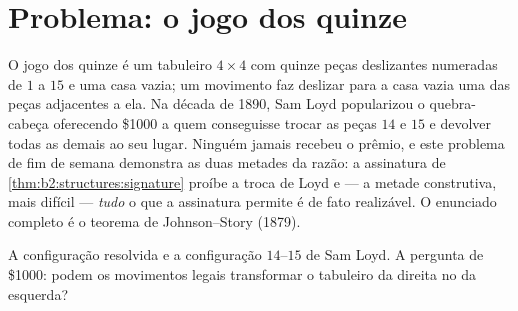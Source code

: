 \section{Problema: o jogo dos quinze}

O jogo dos quinze é um tabuleiro $4 \times 4$ com quinze peças
deslizantes numeradas de $1$ a $15$ e uma casa vazia; um movimento faz
deslizar para a casa vazia uma das peças adjacentes a ela. Na década de
1890, Sam Loyd popularizou o quebra-cabeça oferecendo \$1000 a quem
conseguisse trocar as peças $14$ e $15$ e devolver todas as demais ao seu
lugar. Ninguém jamais recebeu o prêmio, e este problema de fim de semana
demonstra as duas metades da razão: a assinatura de
\cref{thm:b2:structures:signature} proíbe a troca de Loyd e
--- a metade construtiva, mais difícil --- \emph{tudo} o que a
assinatura permite é de fato realizável. O enunciado completo é o
teorema de Johnson--Story (1879).

\begin{omfigure}
\qquad
{}

{\small A configuração resolvida e a configuração $14$--$15$
de Sam Loyd. A pergunta de \$1000: podem os movimentos legais transformar
o tabuleiro da direita no da esquerda?}
\end{omfigure}

